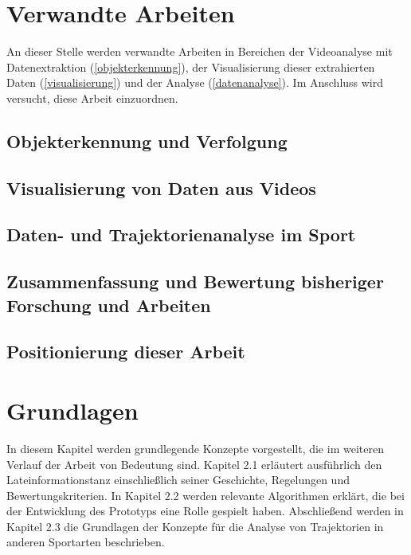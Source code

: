 \documentclass[
  ngerman,
  a4paper,  %
  twoside,  %
  bibliography=totoc,
  headsepline,
  cleardoublepage=empty,
  parskip=half,
  draft=false
]{scrbook}
\begin{document}
\chapter{Verwandte Arbeiten \label{chp:relatedwork}}
An dieser Stelle werden verwandte Arbeiten in Bereichen der Videoanalyse mit Datenextraktion (\ref{objekterkennung}), der Visualisierung dieser extrahierten Daten (\ref{visualisierung}) und der Analyse (\ref{datenanalyse}). Im Anschluss wird versucht, diese Arbeit einzuordnen.
\section{Objekterkennung und Verfolgung \label{objekterkennung}}
\section{Visualisierung von Daten aus Videos \label{visualisierung}}
\section{Daten- und Trajektorienanalyse im Sport \label{datenanalyse}}
\section{Zusammenfassung und Bewertung bisheriger Forschung und Arbeiten}
\section{Positionierung dieser Arbeit}

\chapter{Grundlagen \label{chp:grundlagen}}

In diesem Kapitel werden grundlegende Konzepte vorgestellt, die im weiteren Verlauf der Arbeit von Bedeutung sind. Kapitel 2.1 erläutert ausführlich den Lateinformationstanz einschließlich seiner Geschichte, Regelungen und Bewertungskriterien. In Kapitel 2.2 werden relevante Algorithmen erklärt, die bei der Entwicklung des Prototyps eine Rolle gespielt haben. Abschließend werden in Kapitel 2.3 die Grundlagen der Konzepte für die Analyse von Trajektorien in anderen Sportarten beschrieben.
\end{document}
